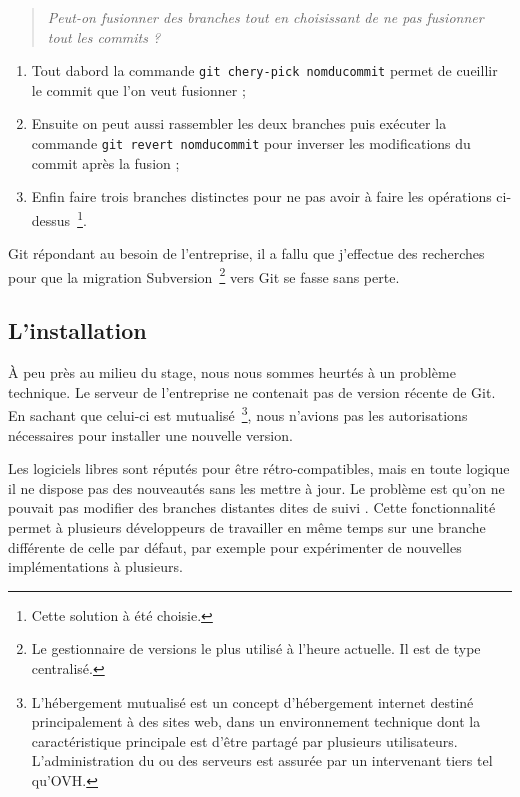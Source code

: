 \begin{quote}
    \emph{Peut-on fusionner des branches tout en choisissant de ne pas
    fusionner tout les commits ?}
\end{quote}

\begin{enumerate}
    \item Tout dabord la commande \texttt{git chery-pick nomducommit} permet
    de \og cueillir \fg{} le commit que l'on veut fusionner ;
    \item Ensuite on peut aussi rassembler les deux branches puis exécuter la
    commande \texttt{git revert nomducommit} pour inverser les modifications
    du commit après la fusion ;
    \item Enfin faire trois branches distinctes pour ne pas avoir à faire les
    opérations ci-dessus\, \footnote{Cette solution à été choisie.}.
\end{enumerate}

Git répondant au besoin de l'entreprise, il a fallu que j'effectue des
recherches pour que la migration Subversion\, \footnote{Le gestionnaire
de versions le plus utilisé à l'heure actuelle. Il est de type
centralisé.} vers Git se fasse sans perte.

\subsection{L'installation} %
\label{sub:L'installation}

À peu près au milieu du stage, nous nous sommes heurtés à un problème
technique. Le serveur de l'entreprise ne contenait pas de version récente de
Git. En sachant que celui-ci est mutualisé\, \footnote{L'hébergement mutualisé
est un concept d'hébergement internet destiné principalement à des sites web,
dans un environnement technique dont la caractéristique principale est d'être
partagé par plusieurs utilisateurs. L'administration du ou des serveurs est
assurée par un intervenant tiers tel qu'OVH.}, nous n'avions pas les
autorisations nécessaires pour installer une nouvelle version.

Les logiciels libres sont réputés pour être rétro-compatibles, mais en toute
logique il ne dispose pas des nouveautés sans les mettre à jour. Le problème
est qu'on ne pouvait pas modifier des branches distantes dites \og de suivi
\fg{}. Cette fonctionnalité permet à plusieurs développeurs de travailler en
même temps sur une branche différente de celle par défaut, par exemple pour
expérimenter de nouvelles implémentations à plusieurs.

